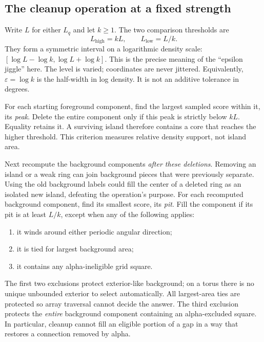 \documentclass[11pt]{article}
\begin{document}
\subsection{The cleanup operation at a fixed strength}

Write $L$ for either $L_q$ and let $k\geq1$. The two comparison thresholds
are
\begin{equation}
 L_{\mathrm{high}}=kL,\qquad L_{\mathrm{low}}=L/k.
 \label{eq:window}
\end{equation}
They form a symmetric interval on a logarithmic density scale:
$[\log L-\log k,\log L+\log k]$. This is the precise meaning of the
``epsilon jiggle'' here. The level is varied; coordinates are never
jittered. Equivalently, $\varepsilon=\log k$ is the half-width in log
density. It is not an additive tolerance in degrees.

For each starting foreground component, find the largest sampled score
within it, its \emph{peak}. Delete the entire component only if this peak
is strictly below $kL$. Equality retains it. A surviving island therefore
contains a core that reaches the higher threshold. This criterion measures
relative density support, not island area.

Next recompute the background components \emph{after these deletions}.
Removing an island or a weak ring can join background pieces that were
previously separate. Using the old background labels could fill the center
of a deleted ring as an isolated new island, defeating the operation's
purpose. For each recomputed background component, find its smallest score,
its \emph{pit}. Fill the component if its pit is at least $L/k$, except
when any of the following applies:
\begin{enumerate}
\item it winds around either periodic angular direction;
\item it is tied for largest background area;
\item it contains any alpha-ineligible grid square.
\end{enumerate}
The first two exclusions protect exterior-like background; on a torus
there is no unique unbounded exterior to select automatically. All
largest-area ties are protected so array traversal cannot decide the
answer. The third exclusion protects the \emph{entire} background
component containing an alpha-excluded square. In particular, cleanup
cannot fill an eligible portion of a gap in a way that restores a
connection removed by alpha.
\end{document}
